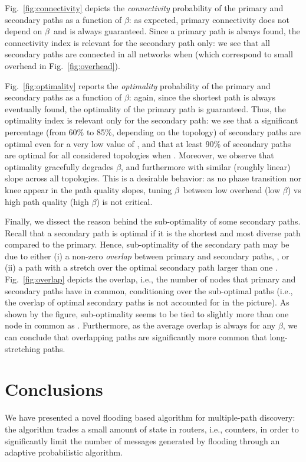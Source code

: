 \documentclass[conference]{IEEEtran}
\newcommand{\Be}{\ensuremath{\beta}} \newcommand{\ML}{\ensuremath{\kappa}} \newcommand{\PB}{\ensuremath{p_b}}
\begin{document}
Fig.~\ref{fig:connectivity} depicts the \emph{connectivity} probability of the primary and secondary paths as a function of \Be: as expected, primary connectivity does not depend on \Be\ and is always guaranteed. Since  a primary path is always found, the connectivity index is relevant for the secondary path only:  we see that all secondary paths are connected in all networks when  (which correspond to small overhead in Fig.~\ref{fig:overhead}).


Fig.~\ref{fig:optimality} reports the \emph{optimality} probability
of the primary and secondary paths as a function of \Be: again, since  the shortest path is always eventually found, the optimality of the primary path is guaranteed. Thus, the optimality index is relevant only  for the secondary path:  we see that a significant percentage (from 60\% to 85\%, depending on the topology) of secondary paths are optimal even for a very low value of , and that at least 90\% of secondary paths are optimal for all considered topologies when . Moreover, we observe  that optimality gracefully degrades \Be, and furthermore with similar (roughly linear) slope across all topologies.
This is a desirable behavior: as no phase transition nor knee appear in the path quality slopes, tuning \Be\ between low overhead (low \Be) vs high path quality (high \Be) is not critical.

Finally, we dissect the reason behind the sub-optimality of some secondary  paths. Recall that a secondary path is optimal if it is the shortest and most diverse path compared to the primary. Hence, sub-optimality of the secondary path may be due to  either (i) a non-zero \emph{overlap} between primary and secondary paths,  ,  or (ii) a path with a stretch  over the optimal secondary path  larger than one .  Fig.~\ref{fig:overlap}  depicts the overlap, i.e., the number of nodes that primary and secondary paths have in common, conditioning over the sub-optimal paths (i.e., the overlap of optimal secondary paths is not accounted for in the picture). As shown by the figure,  sub-optimality seems to be tied to slightly more than one node in common as  . Furthermore, as the average overlap is always  for any \Be, we can conclude that overlapping paths are significantly more common that long-stretching paths. 



 


\section{Conclusions}\label{sec:Future}
We have presented a novel flooding based algorithm for multiple-path discovery: the algorithm trades a small amount of state in routers, i.e.,  counters, in order to significantly limit the number of messages generated by flooding through an adaptive probabilistic algorithm. 
\end{document}
